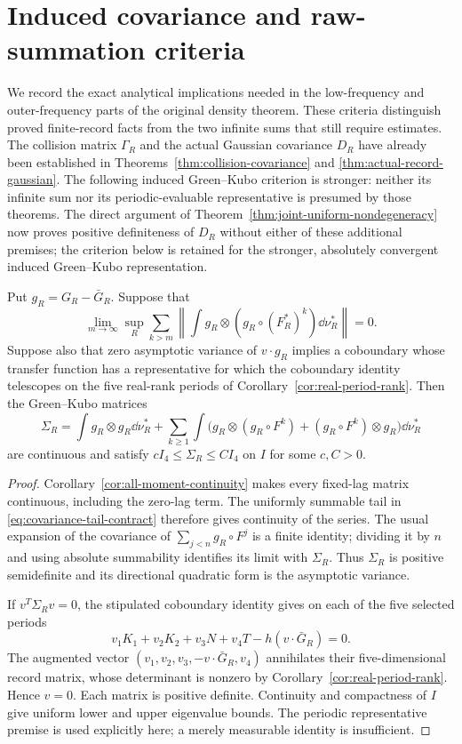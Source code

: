 \section{Induced covariance and raw-summation criteria}
\label{sec:closure-contracts}
We record the exact analytical implications needed in the low-frequency
and outer-frequency parts of the original density theorem. These
criteria distinguish proved finite-record facts from the two infinite
sums that still require estimates. The collision matrix $\Gamma_R$ and
the actual Gaussian covariance $D_R$ have already been established in
Theorems~\ref{thm:collision-covariance} and
\ref{thm:actual-record-gaussian}. The following induced Green--Kubo
criterion is stronger: neither its infinite sum nor its periodic-evaluable
representative is presumed by those theorems. The direct argument of
Theorem~\ref{thm:joint-uniform-nondegeneracy} now proves positive
definiteness of $D_R$ without either of these additional premises;
the criterion below is retained for the stronger, absolutely convergent
induced Green--Kubo representation.

\begin{proposition}
\label{prop:covariance-closure}
Put $g_R=G_R-\bar G_R$. Suppose that
\begin{equation}\label{eq:covariance-tail-contract}
 \lim_{m\to\infty}\sup_R\sum_{k>m}
       \left\|\int g_R\otimes(g_R\circ(F_R^*)^k)\dd\nu_R^*\right\|=0.
\end{equation}
Suppose also that zero asymptotic variance of $v\cdot g_R$ implies a
coboundary whose transfer function has a representative for which the
coboundary identity telescopes on the five real-rank periods of
Corollary~\ref{cor:real-period-rank}. Then the Green--Kubo matrices
\[
 \Sigma_R=\int g_R\otimes g_R\dd\nu_R^*
  +\sum_{k\ge1}\int\bigl(g_R\otimes(g_R\circ F^k)
                    +(g_R\circ F^k)\otimes g_R\bigr)\dd\nu_R^*
\]
are continuous and satisfy $cI_4\le\Sigma_R\le CI_4$ on $I$ for some
$c,C>0$.
\end{proposition}
\begin{proof}
Corollary~\ref{cor:all-moment-continuity} makes every fixed-lag matrix
continuous, including the zero-lag term. The uniformly summable tail in
\eqref{eq:covariance-tail-contract} therefore gives continuity of the
series. The usual expansion of the covariance of $\sum_{j<n}g_R\circ F^j$
is a finite identity; dividing it by $n$ and using absolute summability
identifies its limit with $\Sigma_R$. Thus $\Sigma_R$ is positive
semidefinite and its directional quadratic form is the asymptotic
variance.

If $v^T\Sigma_Rv=0$, the stipulated coboundary identity gives on each of
the five selected periods
\[
 v_1K_1+v_2K_2+v_3N+v_4T-h(v\cdot\bar G_R)=0.
\]
The augmented vector $(v_1,v_2,v_3,-v\cdot\bar G_R,v_4)$ annihilates
their five-dimensional record matrix, whose determinant is nonzero by
Corollary~\ref{cor:real-period-rank}. Hence $v=0$. Each matrix is
positive definite. Continuity and compactness of $I$ give uniform lower
and upper eigenvalue bounds. The periodic representative premise is
used explicitly here; a merely measurable identity is insufficient.
\end{proof}

